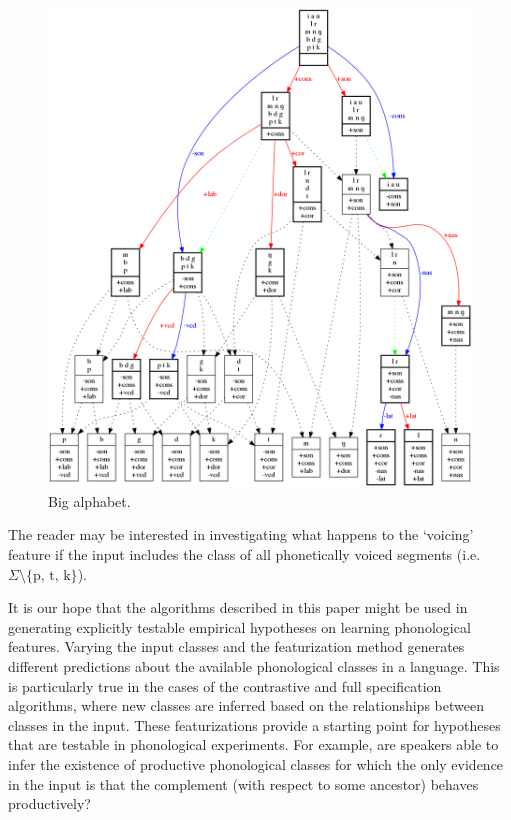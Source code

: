\documentclass[11pt, oneside]{article}   	%
\begin{document}
\begin{figure}[htb!]
  \centering
  \includegraphics[width=\textwidth]{biggun.png}
  \caption{Big alphabet.}
  \label{fig:big_alphabet}
\end{figure}

The reader may be interested in investigating what happens to the `voicing' feature if the input includes the class of all phonetically voiced segments (i.e. $\Sigma \setminus \text{\{p, t, k\}}$).

It is our hope that the algorithms described in this paper might be used in generating explicitly testable empirical hypotheses on learning phonological features. Varying the input classes and the featurization method generates different predictions about the available phonological classes in a language. This is particularly true in the cases of the contrastive and full specification algorithms, where new classes are inferred based on the relationships between classes in the input. These featurizations provide a starting point for hypotheses that are testable in phonological experiments. For example, are speakers able to infer the existence of productive phonological classes for which the only evidence in the input is that the complement (with respect to some ancestor) behaves productively? 
\end{document}

